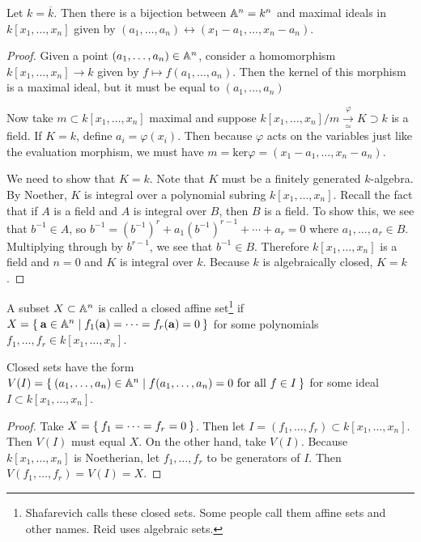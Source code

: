 \documentclass[twoside, 10pt]{article}
\begin{document}
    \begin{thm} Let $k = \overline{k}$. Then there is a
        bijection between $\mathbb{A}^n = k^n$ and maximal ideals in $k[x_1, \ldots,
        x_n]$ given by $(a_1, \ldots, a_n) \leftrightarrow (x_1-a_1, \ldots,
        x_n-a_n)$.  \begin{proof} Given a point $(a_1, \ldots, a_n) \in \mathbb{A}^n$,
            consider a homomorphism $k[x_1, \ldots, x_n] \rightarrow k$ given
            by $f \mapsto f(a_1, \ldots, a_n)$. Then the kernel of this
            morphism is a maximal ideal, but it must be equal to $(a_1, \ldots,
            a_n)$

            Now take $m \subset k[x_1, \ldots, x_n]$ maximal and suppose
            $k[x_1, \ldots, x_n]/m \xrightarrow[\simeq]{\varphi} K \supset k$
            is a field. If $K=k$, define $a_i= \varphi(x_i)$. Then because
            $\varphi$ acts on the variables just like the evaluation morphism,
            we must have $m = \mathrm{ker} \varphi = (x_1-a_1, \ldots,
            x_n-a_n)$. 
            
            We need to show that $K=k$. Note that $K$ must be a finitely
            generated $k$-algebra. By Noether, $K$ is integral over a
            polynomial subring $k[x_1, \ldots, x_n]$. Recall the fact that if
            $A$ is a field and $A$ is integral over $B$, then $B$ is a field.
            To show this, we see that $b^{-1} \in A$, so $b^{-1} = (b^{-1})^r +
            a_1(b^{-1})^{r-1} + \cdots + a_r = 0$ where $a_1, \ldots, a_r \in
            B$. Multiplying through by $b^{r-1}$, we see that $b^{-1} \in B$.
        Therefore $k[x_1, \ldots, x_n]$ is a field and $n=0$ and $K$ is
    integral over $k$. Because $k$ is algebraically closed, $K=k$.  \end{proof}
\end{thm}

    \begin{defn} A subset $X \subset \mathbb{A}^n$ is called a closed affine
        set\footnote{Shafarevich calls these closed sets. Some people call them
            affine sets and other names. Reid uses algebraic sets.} if $X =
            \Set{\mathbf{a} \in \mathbb{A}^n | f_1(\mathbf{a}) = \cdots =
                f_r(\mathbf{a}) = 0 }$ for some polynomials $f_1, \ldots, f_r
            \in k[x_1, \ldots, x_n]$.  \end{defn}

    \begin{lem} Closed sets have the form $V(I) = \Set{(a_1, \ldots, a_n) \in
        \mathbb{A}^n | f(a_1, \ldots, a_n) = 0 \text{ for all $f \in I$}}$ for some
        ideal $I \subset k[x_1, \ldots, x_n]$.  \begin{proof} Take $X =
            \Set{f_1 = \cdots = f_r = 0}$. Then let $I = (f_1, \ldots, f_r)
            \subset k[x_1, \ldots, x_n]$. Then $V(I)$ must equal $X$. On the
            other hand, take $V(I)$. Because $k[x_1, \ldots, x_n]$ is
            Noetherian, let $f_1, \ldots, f_r$ to be generators of $I$. Then
        $V(f_1, \ldots, f_r) = V(I) = X$.  \end{proof} \end{lem}
\end{document}
